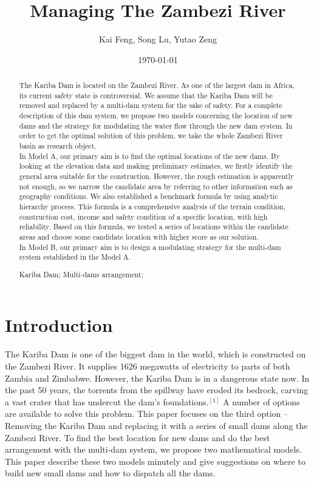 \documentclass{mcmthesis}
\title{Managing The Zambezi River}
\author{Kai Feng, Song Lu, Yutao Zeng}
\date{\today}
\begin{document}
\begin{abstract}
The Kariba Dam is located on the Zambezi River. As one of the largest dam in Africa, its current safety state is controversial. We assume that the Kariba Dam will be removed and replaced by a multi-dam system for the sake of safety. For a complete description of this dam system, we propose two models concerning the location of new dams and the strategy for modulating the water flow through the new dam system. In order to get the optimal solution of this problem, we take the whole Zambezi River basin as research object.\\
\indent In Model A, our primary aim is to find the optimal locations of the new dams. By looking at the elevation data and making preliminary estimates, we firstly identify the general area suitable for the construction. However, the rough estimation is apparently not enough, so we narrow the candidate area by referring to other information such as geography conditions. We also established a benchmark formula by using analytic hierarchy process. This formula is a comprehensive analysis of the terrain condition, construction cost, income and safety condition of a specific location, with high reliability. Based on this formula, we tested a series of locations within the candidate areas and choose some candidate location with higher score as our solution.\\
\indent In Model B, our primary aim is to design a modulating strategy for the multi-dam system established in the Model A.
\begin{keywords}
Kariba Dam; Multi-dams arrangement;
\end{keywords}
\end{abstract}
\maketitle
\section{Introduction}
\indent \indent The Kariba Dam is one of the biggest dam in the world, which is constructed on the Zambezi River. It supplies 1626 megawatts of electricity to parts of both Zambia and Zimbabwe. However, the Kariba Dam is in a dangerous state now. In the past 50 years, the torrents from the spillway have eroded its bedrock, carving a vast crater that has undercut the dam's foundations.$^{[1]}$ A number of options are available to solve this problem. This paper focuses on the third option -- Removing the Kariba Dam and replacing it with a series of small dams along the Zambezi River. To find the best location for new dams and do the best arrangement with the multi-dam system, we propose two mathematical models. This paper describe these two models minutely and give suggestions on where to build new small dams and how to dispatch all the dams. \\
\end{document}
